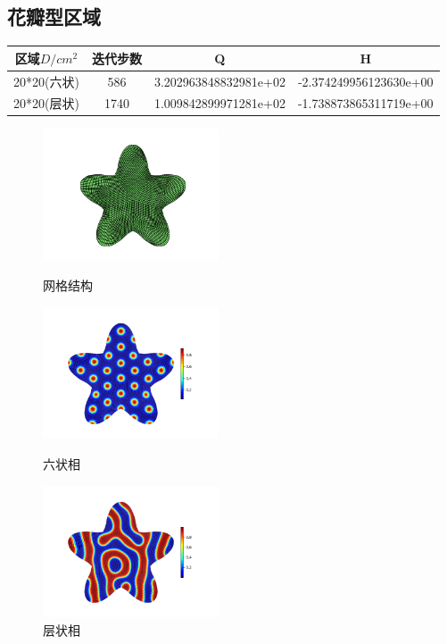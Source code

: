 \documentclass[12pt]{article}
\begin{document}
\begin{CJK}{UTF8}{gkai}
\subsection{花瓣型区域}   
      \begin{table}[H]
      		\centering
      	\begin{tabular}{cccc}
      		\toprule
      		区域$D/cm^2$ &	迭代步数 & Q &  H \\
      		\midrule
      		20*20(六状)&586& 3.202963848832981e+02 & -2.374249956123630e+00\\
      		20*20(层状)&1740 &1.009842899971281e+02 & -1.738873865311719e+00\\
      		\bottomrule
      	\end{tabular}
      \end{table}
      
      \begin{figure}[H]
      	\setlength{\abovecaptionskip}{0.cm}
      	\setlength{\belowcaptionskip}{-0.cm}
      	\begin{minipage}[!htbp]{0.3\linewidth}
      		\includegraphics[width=5.2cm]{Figure_hc.png}
      		\caption*{网格结构}
      	\end{minipage}
      	\hspace{0.23in}
      	\begin{minipage}[!htbp]{0.3\linewidth}
      		\includegraphics[width=5.2cm]{scftfigure584.png}
      		\caption*{六状相}
      	\end{minipage}
      	\hspace{0.23in}
      	\begin{minipage}[!htbp]{0.3\linewidth}
      		\includegraphics[width=5.2cm]{scftfigure1740.png}
      		\caption*{层状相}
      	\end{minipage}
      \end{figure} 
    

\end{CJK}
\end{document}
